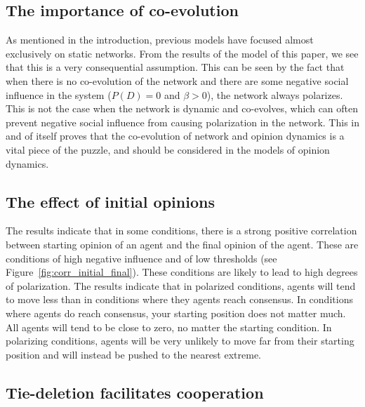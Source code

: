 \documentclass{article}
\begin{document}
\subsection{The importance of co-evolution}
As mentioned in the introduction, previous models have focused almost exclusively on static networks.
From the results of the model of this paper, we see that this is a very consequential assumption. 
This can be seen by the fact that when there is no co-evolution of the network and there are some negative social influence in the system ($P(D) = 0$ and $\beta > 0$), the network always polarizes.
This is not the case when the network is dynamic and co-evolves, which can often prevent negative social influence from causing polarization in the network.
This in and of itself proves that the co-evolution of network and opinion dynamics is a vital piece of the puzzle, and should be considered in the models of opinion dynamics. 

\subsection{The effect of initial opinions}

The results indicate that in some conditions, there is a strong positive correlation between starting opinion of an agent and the final opinion of the agent. 
These are conditions of high negative influence and of low thresholds (see Figure~\ref{fig:corr_initial_final}). These conditions are likely to lead to high degrees of polarization. The results indicate that in polarized conditions, agents will tend to move less than in conditions where they agents reach consensus. In conditions where agents do reach consensus, your starting position does not matter much. All agents will tend to be close to zero, no matter the starting condition. In polarizing conditions, agents will be very unlikely to move far from their starting position and will instead be pushed to the nearest extreme. 

\subsection{Tie-deletion facilitates cooperation}
\end{document}
